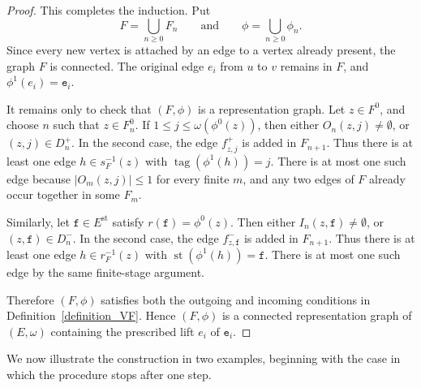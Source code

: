 \documentclass{article}
\theoremstyle{definition}
\begin{document}
\begin{proof}
This completes the induction. Put
$$
F=\bigcup_{n\geq 0}F_n\qquad\text{and}\qquad
\phi=\bigcup_{n\geq 0}\phi_n.
$$
Since every new vertex is attached by an edge to a vertex already present, the graph $F$ is connected. The original edge $e_i$ from $u$ to $v$ remains in $F$, and $\phi^1(e_i)=\mathtt{e}_i$.

It remains only to check that $(F,\phi)$ is a representation graph. Let $z\in F^0$, and choose $n$ such that $z\in F_n^0$. If $1\leq j\leq \omega(\phi^0(z))$, then either $O_n(z,j)\neq\emptyset$, or $(z,j)\in D_n^+$. In the second case, the edge $f_{z,j}^+$ is added in $F_{n+1}$. Thus there is at least one edge $h\in s_F^{-1}(z)$ with $\operatorname{tag}(\phi^1(h))=j$. There is at most one such edge because $|O_m(z,j)|\leq 1$ for every finite $m$, and any two edges of $F$ already occur together in some $F_m$.

Similarly, let $\mathtt{f}\in E^{\mathrm{st}}$ satisfy $r(\mathtt{f})=\phi^0(z)$. Then either $I_n(z,\mathtt{f})\neq\emptyset$, or $(z,\mathtt{f})\in D_n^-$. In the second case, the edge $f_{z,\mathtt{f}}^-$ is added in $F_{n+1}$. Thus there is at least one edge $h\in r_F^{-1}(z)$ with $\operatorname{st}(\phi^1(h))=\mathtt{f}$. There is at most one such edge by the same finite-stage argument.

Therefore $(F,\phi)$ satisfies both the outgoing and incoming conditions in Definition~\ref{definition_VF}. Hence $(F,\phi)$ is a connected representation graph of $(E,\omega)$ containing the prescribed lift $e_i$ of $\mathtt{e}_i$.
\end{proof}

We now illustrate the construction in two examples, beginning with the case in which the procedure stops after one step.
\end{document}
